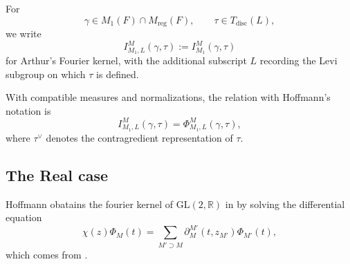 \documentclass[11pt]{amsart}
\newcommand{\GGL}{\mathrm{GL}}
\theoremstyle{definition}
\numberwithin{equation}{section}
\begin{document}
For
\[
\gamma\in M_1(F)\cap M_{\mathrm{reg}}(F),
\qquad
\tau\in T_{\mathrm{disc}}(L),
\]
we write
\[
I_{M_1,L}^{M}(\gamma,\tau)
:=
I_{M_1}^{M}(\gamma,\tau)
\]
for Arthur's Fourier kernel, with the additional
subscript $L$ recording the Levi subgroup on which
$\tau$ is defined.

With compatible measures and normalizations, the
relation with Hoffmann's notation is
\[
I_{M_1,L}^{M}(\gamma,\tau)
=
\Phi_{M_1,L}^{M}(\gamma,\tau),
\]
where $\tau^{\vee}$ denotes the contragredient
representation of $\tau$.










	\subsection{The Real case}
	Hoffmann obatains the fourier kernel of \(\GGL(2,\mathbb{R})\) in \cite{Hof08} by solving the differential equation 
	\[\chi(z)\Phi_M(t) = \sum_{M' \supset M} \partial_M^{M'}(t, z_{M'})\Phi_{M'}(t),\]which comes from \cite{Art88}.
	
\end{document}
